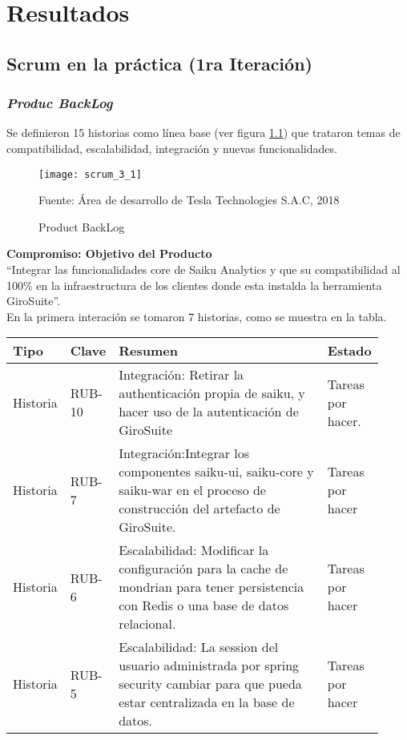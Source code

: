 \chapter{Resultados} \label{chapter:III}
\section{Scrum en la pr\'{a}ctica (1ra Iteraci\'{o}n)}
\begin{spacing}{1.5}
	\subsection{\textit{Produc BackLog}}
	Se definieron 15 historias como l\'{i}nea base (ver figura \ref{figure:chaperIII_1}) que trataron temas de compatibilidad, escalabilidad, integraci\'{o}n y nuevas funcionalidades.
	\begin{figure}[H]
		\centering
		\texttt{[image: scrum\_3\_1]}
		\caption {\centering \small{Product BackLog}} \label{figure:chaperIII_1}
		\small {Fuente: \'{A}rea de desarrollo de Tesla Technologies S.A.C, 2018}
	\end{figure}
	\clearpage
	\textbf{Compromiso: Objetivo del Producto}\\
	``Integrar las funcionalidades core de Saiku Analytics y que su compatibilidad al 100\% en la infraestructura de los clientes donde esta instalda la herramienta GiroSuite''.\\
	En la primera interaci\'{o}n se tomaron 7 historias, como se muestra en la tabla. 
	\begin{table}[bth]\centering\small
	\begin{tabular}[H]{m{0.1\linewidth}m{0.1\linewidth}|m{0.6\linewidth} m{0.12\linewidth}}
			\hline
			\rowcolor[HTML]{CBCEFB} 
			\textbf{Tipo} & \textbf{Clave} &\textbf{Resumen} &\textbf{Estado}\\
			\hline
			Historia &RUB-10 &Integración: Retirar la authenticación propia de saiku, y hacer uso de la autenticación de GiroSuite &Tareas por hacer.\\
			\hline
			Historia &RUB-7 &Integración:Integrar los componentes saiku-ui, saiku-core y saiku-war en el proceso de construcción del artefacto de GiroSuite. &Tareas por hacer\\
			\hline
			Historia &RUB-6 &Escalabilidad: Modificar la configuración para la cache de mondrian para tener persistencia con Redis o una base de datos relacional. &Tareas por hacer\\
			\hline
			Historia &RUB-5 &Escalabilidad: La session del usuario administrada por spring security cambiar para que pueda estar centralizada en la base de datos. &Tareas por hacer\\

\end{tabular}
\end{table}
\end{spacing}
